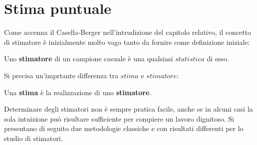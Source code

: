 \section{Stima puntuale}

Come accenna il Casella-Berger nell'intrudizione del capitolo relativo, il concetto di stimatore è inizialmente molto vago tanto da fornire come definizione iniziale:

\begin{definition}
Uno \textbf{stimatore} di un campione casuale è una qualsiasi $statistica$ di esso. 
\end{definition}

Si precisa un'imprtante differenza tra $stima$ e $stimatore$: 
\begin{center}
    Una \textbf{stima} è la realizzazione di uno \textbf{stimatore}.
\end{center}

\vspace{15px}

Determinare degli stimatori non è sempre pratica facile, anche se in alcuni casi la sola intuizione può risultare sufficiente per compiere un lavoro dignitoso. Si presentano di seguito due metodologie classiche e con risultati differenti per lo studio di stimatori.

